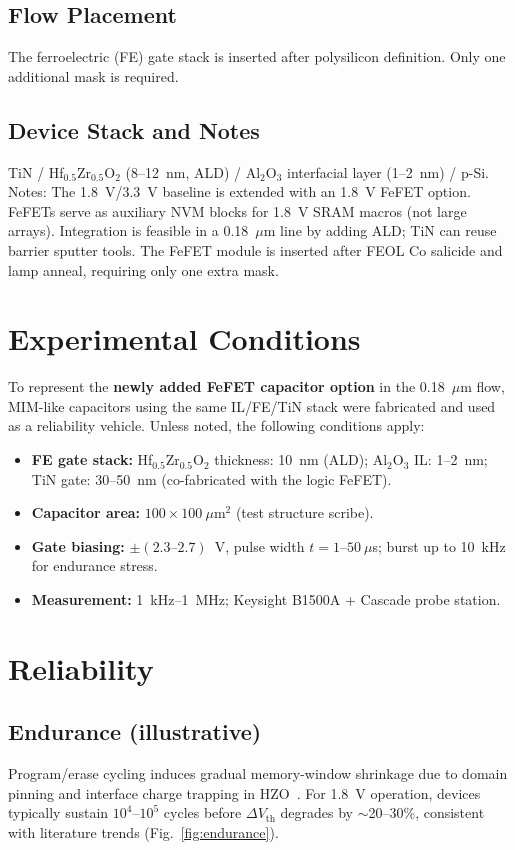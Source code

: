 \documentclass[conference]{IEEEtran}
\begin{document}
\subsection{Flow Placement}
The ferroelectric (FE) gate stack is inserted after polysilicon definition. Only one additional mask is required.

\subsection{Device Stack and Notes}
TiN / Hf$_{0.5}$Zr$_{0.5}$O$_2$ (8--12~nm, ALD) / Al$_2$O$_3$ interfacial layer (1--2~nm) / p-Si. Notes: The 1.8~V/3.3~V baseline is extended with an 1.8~V FeFET option. FeFETs serve as auxiliary NVM blocks for 1.8~V SRAM macros (not large arrays). Integration is feasible in a 0.18~$\mu$m line by adding ALD; TiN can reuse barrier sputter tools. The FeFET module is inserted after FEOL Co salicide and lamp anneal, requiring only one extra mask.

\section{Experimental Conditions}
To represent the \textbf{newly added FeFET capacitor option} in the 0.18~$\mu$m flow, MIM-like capacitors using the same IL/FE/TiN stack were fabricated and used as a reliability vehicle. Unless noted, the following conditions apply:
\begin{itemize}
  \item \textbf{FE gate stack:} Hf$_{0.5}$Zr$_{0.5}$O$_2$ thickness: 10~nm (ALD); Al$_2$O$_3$ IL: 1--2~nm; TiN gate: 30--50~nm (co-fabricated with the logic FeFET).
  \item \textbf{Capacitor area:} $100 \times 100~\mu$m$^2$ (test structure scribe).
  \item \textbf{Gate biasing:} $\pm(2.3\text{--}2.7)$~V, pulse width $t=1\text{--}50~\mu$s; burst up to 10~kHz for endurance stress.
  \item \textbf{Measurement:} 1~kHz--1~MHz; Keysight B1500A + Cascade probe station.
\end{itemize}

\section{Reliability}
\subsection{Endurance (illustrative)}
Program/erase cycling induces gradual memory-window shrinkage due to domain pinning and interface charge trapping in HZO~\cite{Boscke2011,Mueller2012}. For 1.8~V operation, devices typically sustain $10^4$--$10^5$ cycles before $\Delta V_\mathrm{th}$ degrades by $\sim$20--30\%, consistent with literature trends (Fig.~\ref{fig:endurance}).
\end{document}

